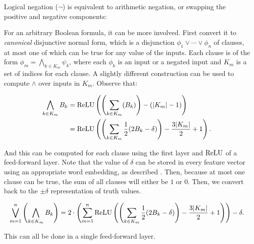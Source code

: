     Logical negation ($\lnot$) is equivalent to arithmetic negation, or swapping the positive and negative components:
    \begin{center}
    \end{center}

    For an arbitrary Boolean formula, it can be more involved. First convert it to \emph{canonical} disjunctive normal form, which is a disjunction $\phi_1 \lor \cdots \lor \phi_n$ of clauses, at most one of which can be true for any value of the inputs.
    Each clause is of the form $\phi_m = \bigwedge_{k\in K_m} \psi_k$, where each $\phi_k$ is an input or a negated input and $K_m$ is a set of indices for each clause. A slightly different construction can be used to compute $\land$ over inputs in $K_m$. Observe that:

    \begin{align*}
    \bigwedge_{k\in K_m} B_k &= \text{ReLU}\left(\left(\sum_{k\in K_m} (B_k)\right) -(|K_m|-1)\right) \\ &=\text{ReLU}\left(\left(\sum_{k\in K_m} \frac{1}{2}(2B_k-\delta) \right) - \frac{3|K_m|}{2}+1\right).
    \end{align*}

    And this can be computed for each clause using the first layer and $\text{ReLU}$ of a feed-forward layer.
    Note that the value of $\delta$ can be stored in every feature vector using an appropriate word embedding, as described .
    Then, because at most one clause can be true, the sum of all clauses will either be $1$ or $0$. Then, we convert back to the $\pm\delta$ representation of truth values.

    \[\bigvee_{m=1}^n \left(\bigwedge_{k\in K_m} B_k \right)=2\cdot\left(\sum_{m=1}^n\text{ReLU}\left(\left(\sum_{k\in K_m} \frac{1}{2}(2B_k-\delta) \right) - \frac{3|K_m|}{2}+1\right)\right)-\delta.\]

    This can all be done in a single feed-forward layer.


